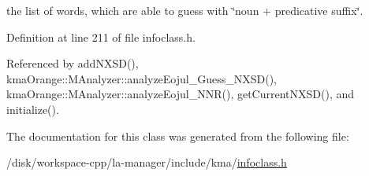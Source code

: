 the list of words, which are able to guess with \char`\"{}noun + predicative suffix\char`\"{}. 



Definition at line 211 of file infoclass.h.

Referenced by addNXSD(), kmaOrange::MAnalyzer::analyzeEojul\_\-Guess\_\-NXSD(), kmaOrange::MAnalyzer::analyzeEojul\_\-NNR(), getCurrentNXSD(), and initialize().

The documentation for this class was generated from the following file:\begin{CompactItemize}
\item 
/disk/workspace-cpp/la-manager/include/kma/\hyperlink{infoclass_8h}{infoclass.h}\end{CompactItemize}
